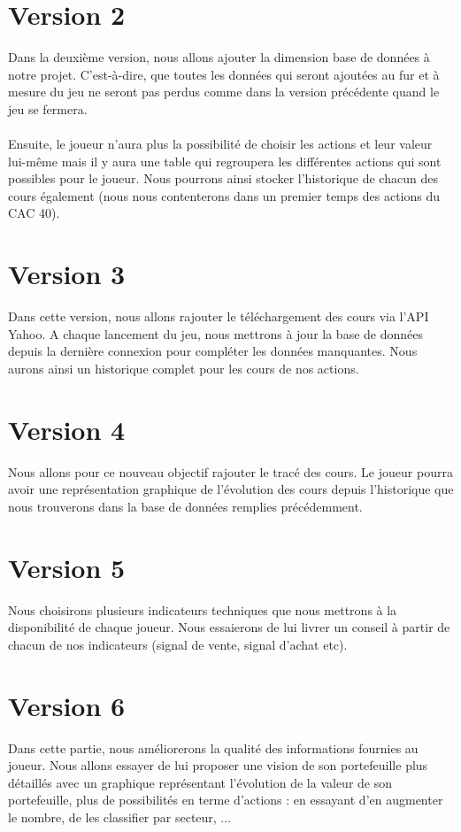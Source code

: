 \section{Version 2}
Dans la deuxième version, nous allons ajouter la dimension base de données à notre projet. C'est-à-dire, que toutes les données qui seront ajoutées au fur et à mesure du jeu ne seront pas perdus comme dans la version précédente quand le jeu se fermera. \\ \\
Ensuite, le joueur n'aura plus la possibilité de choisir les actions et leur valeur lui-même mais il y aura une table qui regroupera les différentes actions qui sont possibles pour le joueur. Nous pourrons ainsi stocker l'historique de chacun des cours également (nous nous contenterons dans un premier temps des actions du CAC 40). 

\section{Version 3}
Dans cette version, nous allons rajouter le téléchargement des cours via l'API Yahoo. A chaque lancement du jeu, nous mettrons à jour la base de données depuis la dernière connexion pour compléter les données manquantes. Nous aurons ainsi un historique complet pour les cours de nos actions. 

\section{Version 4}
Nous allons pour ce nouveau objectif rajouter le tracé des cours. Le joueur pourra avoir une représentation graphique de l'évolution des cours depuis l'historique que nous trouverons dans la base de données remplies précédemment. 

\section{Version 5}
Nous choisirons plusieurs indicateurs techniques que nous mettrons à la disponibilité de chaque joueur. Nous essaierons de lui livrer un conseil à partir de chacun de nos indicateurs (signal de vente, signal d'achat etc). 

\section{Version 6}
Dans cette partie, nous améliorerons la qualité des informations fournies au joueur. Nous  
allons essayer de lui proposer une vision de son portefeuille plus détaillés avec un graphique représentant l'évolution de la valeur de son portefeuille, plus de possibilités en terme d'actions : en essayant d'en augmenter le nombre, de les classifier par secteur, ...

